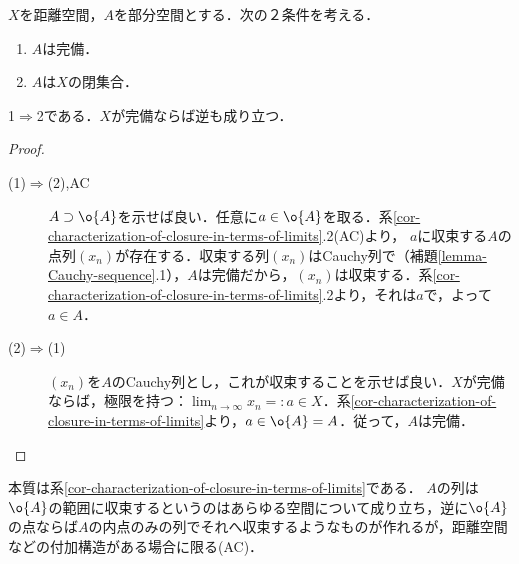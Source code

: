 \documentclass[uplatex,dvipdfmx]{jsreport}
\begin{document}
\begin{proposition}[距離空間内の閉集合]\label{prop-complete-sets-in-metric-space}
    $X$を距離空間，$A$を部分空間とする．次の２条件を考える．
    \begin{enumerate}
        \item $A$は完備．
        \item $A$は$X$の閉集合．
    \end{enumerate}
    1$\Rightarrow$2である．$X$が完備ならば逆も成り立つ．
\end{proposition}
\begin{proof}\mbox{}
    \begin{description}
        \item[(1)$\Rightarrow$(2),AC] $A\supset\o{A}$を示せば良い．任意に$a\in\o{A}$を取る．系\ref{cor-characterization-of-closure-in-terms-of-limits}.2(AC)より，
        $a$に収束する$A$の点列$(x_n)$が存在する．収束する列$(x_n)$はCauchy列で（補題\ref{lemma-Cauchy-sequence}.1），$A$は完備だから，$(x_n)$は収束する．系\ref{cor-characterization-of-closure-in-terms-of-limits}.2より，それは$a$で，よって$a\in A$．
        \item[(2)$\Rightarrow$(1)]
        $(x_n)$を$A$のCauchy列とし，これが収束することを示せば良い．$X$が完備ならば，極限を持つ：$\lim_{n\to\infty}x_n=:a\in X$．系\ref{cor-characterization-of-closure-in-terms-of-limits}より，$a\in\o{A}=A$．従って，$A$は完備．
    \end{description}
\end{proof}
\begin{remarks}
    本質は系\ref{cor-characterization-of-closure-in-terms-of-limits}である．
    $A$の列は$\o{A}$の範囲に収束するというのはあらゆる空間について成り立ち，逆に$\o{A}$の点ならば$A$の内点のみの列でそれへ収束するようなものが作れるが，距離空間などの付加構造がある場合に限る(AC)．
\end{remarks}
\end{document}
